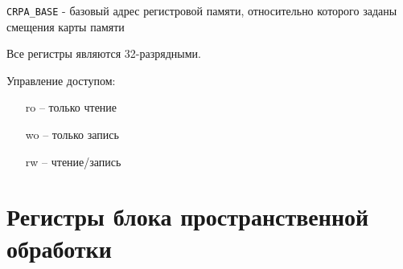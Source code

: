 \texttt{CRPA\_BASE} - базовый адрес регистровой памяти, относительно которого заданы смещения карты памяти

Все регистры являются 32-разрядными.

Управление доступом:
\begin{itemize}
\item[ro] -- только чтение
\item[wo] -- только запись
\item[rw] -- чтение/запись
\end{itemize}


\newpage
\section{Регистры блока пространственной обработки}
\label{sec:commons}

